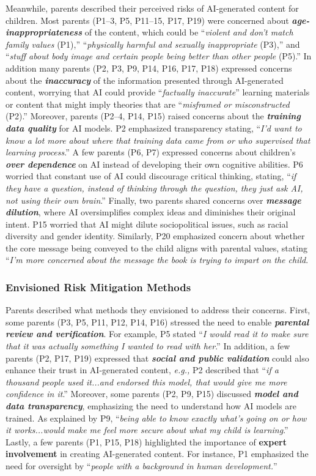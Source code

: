 Meanwhile, parents described their perceived risks of AI-generated content for children. Most parents (P1--3, P5, P11--15, P17, P19) were concerned about \textit{\textbf{age-inappropriateness}} of the content, which could be ``\textit{violent and don’t match family values} (P1),'' ``\textit{physically harmful and sexually inappropriate} (P3),'' and ``\textit{stuff about body image and certain people being better than other people} (P5).'' In addition many parents (P2, P3, P9, P14, P16, P17, P18) expressed concerns about the \textit{\textbf{inaccuracy}} of the information presented through AI-generated content, worrying that AI could provide ``\textit{factually inaccurate}'' learning materials or content that might imply theories that are ``\textit{misframed or misconstructed} (P2).'' Moreover, parents (P2--4, P14, P15) raised concerns about the \textit{\textbf{training data quality}} for AI models. P2 emphasized transparency stating, ``\textit{I'd want to know a lot more about where that training data came from or who supervised that learning process}.'' A few parents (P6, P7) expressed concerns about children's \textit{\textbf{over dependence}} on AI instead of developing their own cognitive abilities. P6 worried that constant use of AI could discourage critical thinking, stating, ``\textit{if they have a question, instead of thinking through the question, they just ask AI, not using their own brain}.'' Finally, two parents shared concerns over \textit{\textbf{message dilution}}, where AI oversimplifies complex ideas and diminishes their original intent. P15 worried that AI might dilute sociopolitical issues, such as racial diversity and gender identity. Similarly, P20 emphasized concern about whether the core message being conveyed to the child aligns with parental values, stating ``\textit{I'm more concerned about the message the book is trying to impart on the child}.

\subsubsection{Envisioned Risk Mitigation Methods}
Parents described what methods they envisioned to address their concerns. First, some parents (P3, P5, P11, P12, P14, P16) stressed the need to enable \textit{\textbf{parental review and verification}}. For example, P5 stated ``\textit{I would read it to make sure that it was actually something I wanted to read with her}.'' In addition, a few parents (P2, P17, P19) expressed that \textit{\textbf{social and public validation}} could also enhance their trust in AI-generated content, \textit{e.g.,} P2 described that ``\textit{if a thousand people used it...and endorsed this model, that would give me more confidence in it}.'' Moreover, some parents (P2, P9, P15) discussed \textit{\textbf{model and data transparency}}, emphasizing the need to understand how AI models are trained. As explained by P9, ``\textit{being able to know exactly what's going on or how it works...would make me feel more secure about what my child is learning}.'' Lastly, a few parents (P1, P15, P18) highlighted the importance of \textbf{expert involvement} in creating AI-generated content. For instance, P1 emphasized the need for oversight by ``\textit{people with a background in human development.}''